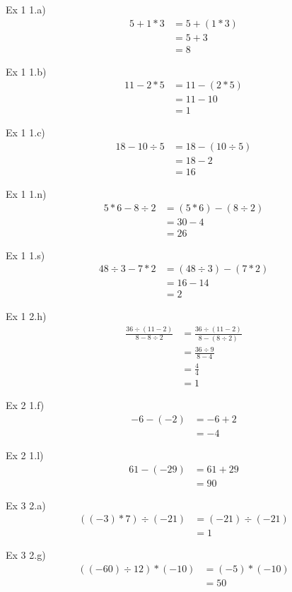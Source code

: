 \documentclass[12pt]{article}
\begin{document}
Ex 1 1.a)
\begin{align*}
  5 + 1 * 3 & = 5 + (1 * 3) \\
            & = 5 + 3       \\
            & = 8
\end{align*}

Ex 1 1.b)
\begin{align*}
  11 - 2 * 5 & = 11 - (2 * 5) \\
             & = 11 - 10      \\
             & = 1
\end{align*}

Ex 1 1.c)
\begin{align*}
  18 - 10 \div 5 & = 18 - (10 \div  5) \\
                 & = 18 - 2            \\
                 & = 16
\end{align*}

Ex 1 1.n)
\begin{align*}
  5 * 6 - 8 \div 2 & = (5 * 6) - (8 \div 2) \\
                   & = 30 - 4               \\
                   & = 26
\end{align*}

Ex 1 1.s)
\begin{align*}
  48 \div 3 - 7 * 2 & = (48 \div 3) - (7 * 2) \\
                    & = 16 - 14               \\
                    & = 2
\end{align*}

Ex 1 2.h)
\begin{align*}
  \frac{36 \div (11 - 2)}{8 - 8 \div 2} & = \frac{36 \div (11 - 2)}{8 - (8 \div 2)} \\
                                        & = \frac{36 \div 9}{8 - 4}                 \\
                                        & = \frac{4}{4}                             \\
                                        & = 1
\end{align*}

Ex 2 1.f)
\begin{align*}
  -6 - (-2) & = -6 + 2 \\
            & = -4
\end{align*}

Ex 2 1.l)
\begin{align*}
  61 - (-29) & = 61 + 29 \\
             & = 90
\end{align*}

Ex 3 2.a)
\begin{align*}
  ((-3) * 7) \div (-21) & = (-21) \div (-21) \\
                        & = 1
\end{align*}

Ex 3 2.g)
\begin{align*}
  ((-60) \div 12) * (-10) & = (-5) * (-10) \\
                          & = 50
\end{align*}
\end{document}
